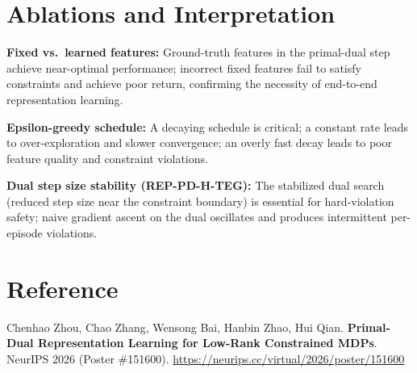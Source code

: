 \documentclass[10pt,twocolumn]{article}
\begin{document}
\section{Ablations and Interpretation}

\textbf{Fixed vs.\ learned features:}
Ground-truth features in the primal-dual step achieve near-optimal performance;
incorrect fixed features fail to satisfy constraints and achieve poor return,
confirming the necessity of end-to-end representation learning.

\textbf{Epsilon-greedy schedule:}
A decaying schedule is critical; a constant rate leads to over-exploration and
slower convergence; an overly fast decay leads to poor feature quality and
constraint violations.

\textbf{Dual step size stability (REP-PD-H-TEG):}
The stabilized dual search (reduced step size near the constraint boundary)
is essential for hard-violation safety; naive gradient ascent on the dual
oscillates and produces intermittent per-episode violations.

\section*{Reference}

Chenhao Zhou, Chao Zhang, Wensong Bai, Hanbin Zhao, Hui Qian.
\textbf{Primal-Dual Representation Learning for Low-Rank Constrained MDPs}.
NeurIPS 2026 (Poster \#151600).
\url{https://neurips.cc/virtual/2026/poster/151600}
\end{document}
